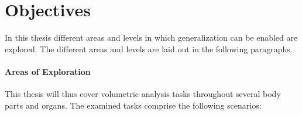 





    \section{Objectives} %
        In this thesis different areas and levels in which generalization can be enabled are explored. The different areas and levels are laid out in the following paragraphs.

        \paragraph{Areas of Exploration}
            This thesis will thus cover volumetric analysis tasks throughout several body parts and organs. The examined tasks comprise the following scenarios:

